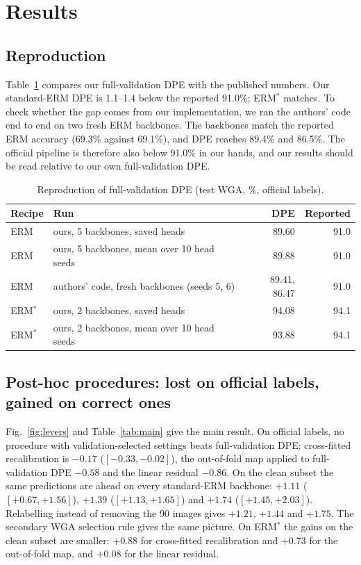 \section{Results}
\label{sec:results}
\subsection{Reproduction}
Table~\ref{tab:repro} compares our full-validation DPE with the published numbers. Our standard-ERM DPE is 1.1--1.4\pp{} below the reported 91.0\%; ERM$^*$ matches. To check whether the gap comes from our implementation, we ran the authors' code end to end on two fresh ERM backbones. The backbones match the reported ERM accuracy (69.3\% against 69.1\%), and DPE reaches 89.4\% and 86.5\%. The official pipeline is therefore also below 91.0\% in our hands, and our results should be read relative to our own full-validation DPE.

\begin{table}[t]
\centering\small
\caption{Reproduction of full-validation DPE (test WGA, \%, official labels).}
\label{tab:repro}
\begin{tabular}{@{}llrr@{}}
\toprule
Recipe & Run & DPE & Reported \cite{to2025dpe}\\\midrule
ERM & ours, 5 backbones, saved heads & 89.60 & 91.0\\
ERM & ours, 5 backbones, mean over 10 head seeds & 89.88 & 91.0\\
ERM & authors' code, fresh backbones (seeds 5, 6) & 89.41, 86.47 & 91.0\\
ERM$^*$ & ours, 2 backbones, saved heads & 94.08 & 94.1\\
ERM$^*$ & ours, 2 backbones, mean over 10 head seeds & 93.88 & 94.1\\
\bottomrule
\end{tabular}
\end{table}

\subsection{Post-hoc procedures: lost on official labels, gained on correct ones}
Fig.~\ref{fig:levers} and Table~\ref{tab:main} give the main result. On official labels, no procedure with validation-selected settings beats full-validation DPE: cross-fitted recalibration is $-0.17$\pp{} ($[-0.33,-0.02]$), the out-of-fold map applied to full-validation DPE $-0.58$\pp{} and the linear residual $-0.86$\pp. On the clean subset the same predictions are ahead on every standard-ERM backbone: $+1.11$\pp{} ($[+0.67,+1.56]$), $+1.39$\pp{} ($[+1.13,+1.65]$) and $+1.74$\pp{} ($[+1.45,+2.03]$). Relabelling instead of removing the 90 images gives $+1.21$, $+1.44$ and $+1.75$\pp. The secondary WGA selection rule gives the same picture. On ERM$^*$ the gains on the clean subset are smaller: $+0.88$\pp{} for cross-fitted recalibration and $+0.73$\pp{} for the out-of-fold map, and $+0.08$\pp{} for the linear residual.

